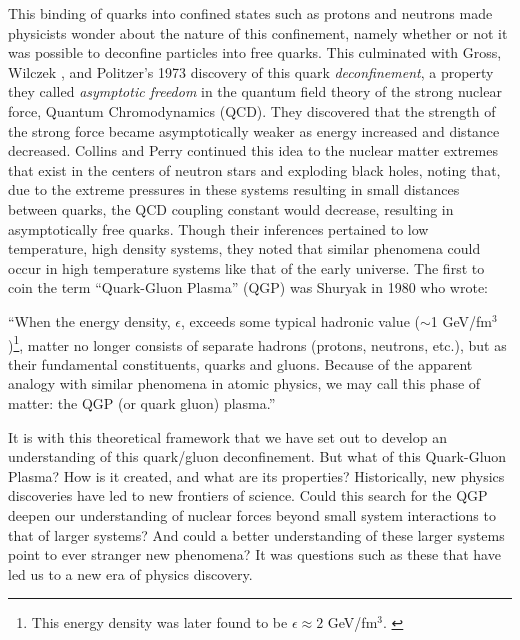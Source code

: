 This binding of quarks into confined states such as protons and neutrons made physicists wonder about the nature of this confinement, namely whether or not it was possible to deconfine particles into free quarks. This culminated with Gross, Wilczek \citep{PhysRevD.8.3633}, and Politzer's \citep{PhysRevLett.30.1346} 1973 discovery of this quark \textit{deconfinement}, a property they called \textit{asymptotic freedom} in the quantum field theory of the strong nuclear force, Quantum Chromodynamics (QCD). They discovered that the strength of the strong force became asymptotically weaker as energy increased and distance decreased. Collins and Perry \citep{Collins:1974ky} continued this idea to the nuclear matter extremes that exist in the centers of neutron stars and exploding black holes, noting that, due to the extreme pressures in these systems resulting in small distances between quarks, the QCD coupling constant would decrease, resulting in asymptotically free quarks. Though their inferences pertained to low temperature, high density systems, they noted that similar phenomena could occur in high temperature systems like that of the early universe. The first to coin the term ``Quark-Gluon Plasma'' (QGP) was Shuryak in 1980 \citep{Shuryak:1980tp} who wrote: 

\begin{addmargin}[1.5em]{2em}``When the energy density, $\epsilon$, exceeds some typical hadronic value ($\sim$1 GeV/fm$^{3}$)\footnote{This energy density was later found to be $\epsilon \approx 2$ GeV/fm$^3$. \citep{Fries:2006pv}}, matter no longer consists of separate hadrons (protons, neutrons, etc.), but as their fundamental constituents, quarks and gluons. Because of the apparent analogy with similar phenomena in atomic physics, we may call this phase of matter: the QGP (or quark gluon) plasma.''
\end{addmargin}
 
It is with this theoretical framework that we have set out to develop an understanding of this quark/gluon deconfinement. But what of this Quark-Gluon Plasma? How is it created, and what are its properties? Historically, new physics discoveries have led to new frontiers of science. Could this search for the QGP deepen our understanding of nuclear forces beyond small system interactions to that of larger systems? And could a better understanding of these larger systems point to ever stranger new phenomena? It was questions such as these that have led us to a new era of physics discovery.

